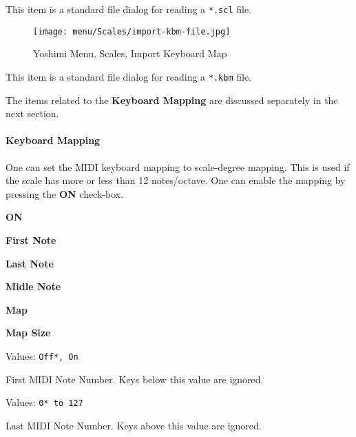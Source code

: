    This item is a standard file dialog for reading
   a \texttt{*.scl} file.

\begin{figure}[H]
   \centering 
   \texttt{[image: menu/Scales/import-kbm-file.jpg]}
   \caption{Yoshimi Menu, Scales, Import Keyboard Map}
   \label{fig:yoshimi_menu_scales_import_keyboard_map}
\end{figure}

   This item is a standard file dialog for reading
   a \texttt{*.kbm} file.


   The items related to the \textbf{Keyboard Mapping} are discussed
   separately in the next section.

\paragraph{Keyboard Mapping}
\label{paragraph:menu_scales_keyboard_mapping}

   One can set the MIDI keyboard mapping to scale-degree mapping.
   This is used if the scale has more or less than 12 notes/octave.
   One can enable the mapping by pressing the \textbf{ON} check-box.

   \begin{enumber}
      \item \textbf{ON}
      \item \textbf{First Note}
      \item \textbf{Last Note}
      \item \textbf{Midle Note}
      \item \textbf{Map}
      \item \textbf{Map Size}
   \end{enumber}

   \setcounter{ItemCounter}{0}      %


   Values: \texttt{Off*, On}

   First MIDI Note Number.
   Keys below this value are ignored.

   Values: \texttt{0* to 127}

   Last MIDI Note Number.
   Keys above this value are ignored.

